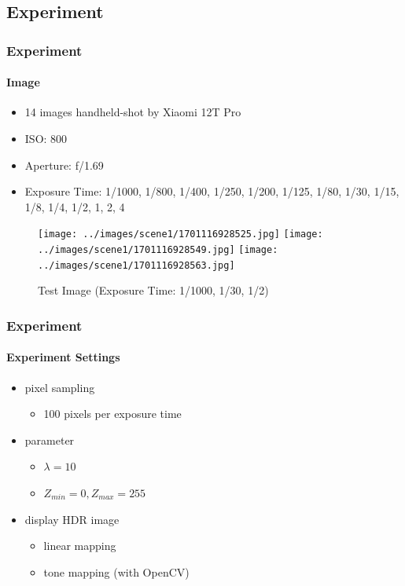 \documentclass[
	11pt, %
	aspectratio=169, %
]{beamer}
\begin{document}
\subsection{Experiment}

\begin{frame}
	\frametitle{Experiment}
	\framesubtitle{Image}

	\begin{itemize}
		\item 14 images handheld-shot by Xiaomi 12T Pro
		\item ISO: 800
		\item Aperture: f/1.69
		\item Exposure Time: 1/1000, 1/800, 1/400, 1/250, 1/200, 1/125, 1/80, 
		1/30, 1/15, 1/8, 1/4, 1/2, 1, 2, 4
	\end{itemize}

	\begin{figure}[!htb]
		  \texttt{[image: ../images/scene1/1701116928525.jpg]}
		\endminipage\hfill
		  \texttt{[image: ../images/scene1/1701116928549.jpg]}
		\endminipage\hfill
		  \texttt{[image: ../images/scene1/1701116928563.jpg]}
		\endminipage
		\caption{Test Image (Exposure Time: 1/1000, 1/30, 1/2)}
	\end{figure}
\end{frame}

\begin{frame}
	\frametitle{Experiment}
	\framesubtitle{Experiment Settings}

	\begin{itemize}
		\item pixel sampling
		\begin{itemize}
			\item 100 pixels per exposure time
		\end{itemize}
		\item parameter
		\begin{itemize}
			\item $\lambda = 10$
			\item $Z_{min} = 0, Z_{max} = 255$
		\end{itemize}
		\item display HDR image
		\begin{itemize}
			\item linear mapping
			\item tone mapping (with OpenCV)
		\end{itemize}
	\end{itemize}
\end{frame}
\end{document}

